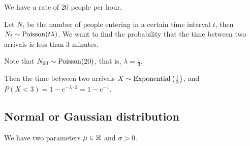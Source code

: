 \documentclass[12pt]{extarticle}
\newcommand{\Poisson}{{\operatorfont Poisson}}
\newcommand{\Exponential}{{\operatorfont Exponential}}
\begin{document}
\begin{example}
    We have a rate of 20 people per hour.

    Let $N_t$ be the number of people entering in a certain time interval $t$, then $N_t \sim \Poisson(t \lambda)$.
    We want to find the probability that the time between two arrivals is less than 3 minutes.

    Note that $N_{60} \sim \Poisson(20)$, that is, $\lambda = \frac{1}{3}$.

    Then the time between two arrivals $X \sim \Exponential\left(\frac{1}{3}\right)$, and $P(X < 3) = 1 - e^{-\lambda \cdot 3} = 1 - e^{-1}$.
\end{example}

\subsection{Normal or Gaussian distribution}
\label{sec:normal_distribution}

We have two parameters $\mu \in \mathbb{R}$ and $\sigma > 0$.
\end{document}
